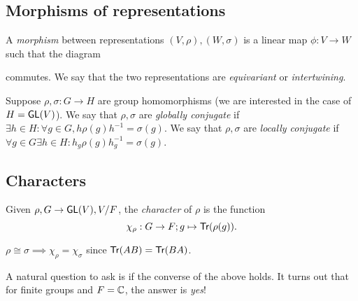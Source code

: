 \subsection{Morphisms of representations}
\begin{definition}
A \emph{morphism} between representations $(V, \rho), (W, \sigma)$ is a linear map $\phi: V \to W$ such that the diagram
\begin{center}
\end{center}
commutes. We say that the two representations are \emph{equivariant} or \emph{intertwining}. 
\end{definition}
\begin{definition}
Suppose $\rho, \sigma: G \to H$ are group homomorphisms (we are interested in the case of $H = \mathsf{GL}(V)$). We say that $\rho, \sigma$ are \emph{globally conjugate} if $\exists h \in H: \forall g\in G, h\rho(g)h^{-1} = \sigma(g)$. We say that $\rho, \sigma$ are \emph{locally conjugate} if $\forall g \in G \exists h \in H: h_g\rho(g)h_g^{-1} = \sigma(g)$. 
\end{definition}
\subsection{Characters}

\begin{definition}
Given $\rho, G \to \mathsf{GL}(V), V/F$, the \emph{character} of $\rho$ is the function
\[
\chi_\rho : G \to F; g \mapsto \mathsf{Tr}(\rho(g)).
\]
\end{definition}
\begin{remark}
$\rho \cong \sigma \implies \chi_\rho = \chi_\sigma$ since $\mathsf{Tr}(AB) = \mathsf{Tr}(BA)$. 
\end{remark}
A natural question to ask is if the converse of the above holds. It turns out that for finite groups and $F = \mathbb{C}$, the answer is \emph{yes}!

